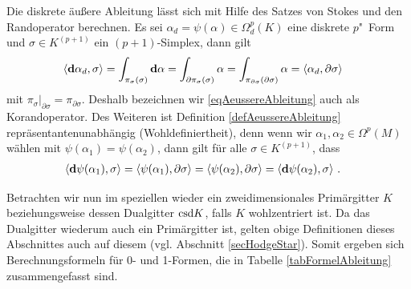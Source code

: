   \begin{folgerung}
    Die diskrete äußere Ableitung lässt sich mit Hilfe des Satzes von Stokes und den Randoperator berechnen.
    Es sei \( \alpha_{d}=\psi(\alpha)\in\Omega_{d}^{p}(K) \) eine diskrete \( p \)"~Form und \( \sigma\in K^{(p+1)} \) ein \( (p+1) \)-Simplex, dann gilt
    \begin{align}
      \left\langle \mathbf{d}\alpha_{d} , \sigma \right\rangle &= \int_{\pi_{\sigma}(\sigma)} \mathbf{d}\alpha 
                                                          = \int_{\partial\pi_{\sigma}(\sigma)} \alpha
                                                          = \int_{\pi_{\partial\sigma}(\partial\sigma)} \alpha
                                                          = \left\langle \alpha_{d} , \partial\sigma \right\rangle
    \end{align}
    mit \( \pi_{\sigma}|_{\partial\sigma} = \pi_{\partial\sigma} \).
    Deshalb bezeichnen wir \eqref{eqAeussereAbleitung} auch als Korandoperator.
    Des Weiteren ist Definition \ref{defAeussereAbleitung} repräsentantenunabhängig (Wohldefiniertheit),
    denn wenn wir \mbox{\( \alpha_{1},\alpha_{2} \in \Omega^{p}(M) \)} wählen 
    mit \( \psi(\alpha_{1}) = \psi(\alpha_{2}) \), 
    dann gilt für alle \( \sigma\in K^{(p+1)} \), dass
    \begin{align}
      \left\langle \mathbf{d}\psi(\alpha_{1}), \sigma \right\rangle &= \left\langle \psi(\alpha_{1}), \partial\sigma \right\rangle
                                                               = \left\langle \psi(\alpha_{2}), \partial\sigma \right\rangle
                                                               = \left\langle \mathbf{d}\psi(\alpha_{2}), \sigma \right\rangle
                                                               \,\text{.}
    \end{align}
  \end{folgerung}
  
  \begin{bemerkung}
    Betrachten wir nun im speziellen wieder ein zweidimensionales Primärgitter \( K \) beziehungsweise dessen Dualgitter \( \text{csd} K \), 
    falls \( K \) wohlzentriert ist.
    Da das Dualgitter wiederum auch ein Primärgitter ist, gelten obige Definitionen dieses Abschnittes auch auf diesem
    (vgl. Abschnitt \ref{secHodgeStar}).
    Somit ergeben sich Berechnungsformeln für 0- und 1-Formen, die in Tabelle \ref{tabFormelAbleitung} zusammengefasst sind.
  \end{bemerkung}

